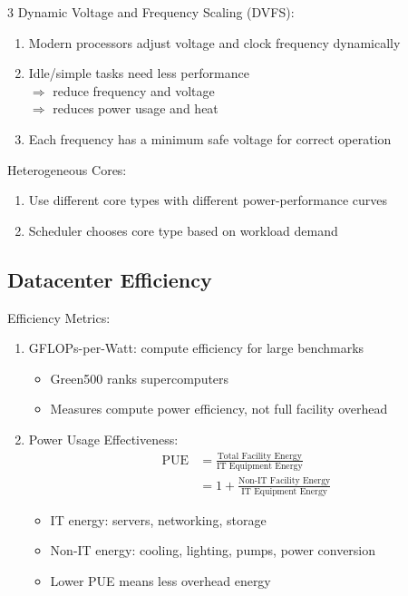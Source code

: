 \documentclass[12pt, a4paper]{article}
\begin{document}
\begin{multicols*}{3}
Dynamic Voltage and Frequency Scaling (DVFS):
\begin{enumerate}[\roman*.]
  \item Modern processors adjust voltage and clock frequency dynamically
  \item Idle/simple tasks need less performance\\$\Rightarrow$ reduce frequency and voltage\\$\Rightarrow$ reduces power usage and heat
  \item Each frequency has a minimum safe voltage for correct operation
\end{enumerate}

Heterogeneous Cores:
\begin{enumerate}[\roman*.]
  \item Use different core types with different power-performance curves
  \item Scheduler chooses core type based on workload demand
\end{enumerate}

\colbreak

\subsection{Datacenter Efficiency}

Efficiency Metrics:
\begin{enumerate}[\roman*.]
  \item GFLOPs-per-Watt: compute efficiency for large benchmarks
    \begin{itemize}[leftmargin=*]\vspace{2pt}
      \item Green500 ranks supercomputers
      \item Measures compute power efficiency, not full facility overhead
    \end{itemize}
  \item Power Usage Effectiveness:
    \begin{align*}
      \text{PUE}
      &=
      \frac{\text{Total Facility Energy}}{\text{IT Equipment Energy}}\\
      &=
      1 +
      \frac{\text{Non-IT Facility Energy}}{\text{IT Equipment Energy}}
    \end{align*}
    \begin{itemize}[leftmargin=*]\vspace{2pt}
      \item IT energy: servers, networking, storage
      \item Non-IT energy: cooling, lighting, pumps, power conversion
      \item Lower PUE means less overhead energy
    \end{itemize}
\end{enumerate}


\end{multicols*}
\end{document}
